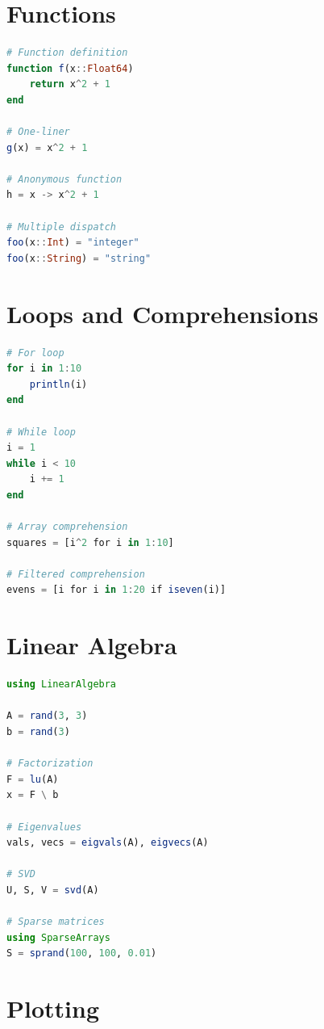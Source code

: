 \section{Functions}
\label{app:julia:functions}

\begin{lstlisting}[language=Julia]
# Function definition
function f(x::Float64)
    return x^2 + 1
end

# One-liner
g(x) = x^2 + 1

# Anonymous function
h = x -> x^2 + 1

# Multiple dispatch
foo(x::Int) = "integer"
foo(x::String) = "string"
    \end{lstlisting}

\section{Loops and Comprehensions}
\label{app:julia:loops}

\begin{lstlisting}[language=Julia]
# For loop
for i in 1:10
    println(i)
end

# While loop
i = 1
while i < 10
    i += 1
end

# Array comprehension
squares = [i^2 for i in 1:10]

# Filtered comprehension
evens = [i for i in 1:20 if iseven(i)]
    \end{lstlisting}

\section{Linear Algebra}
\label{app:julia:linalg}

\begin{lstlisting}[language=Julia]
using LinearAlgebra

A = rand(3, 3)
b = rand(3)

# Factorization
F = lu(A)
x = F \ b

# Eigenvalues
vals, vecs = eigvals(A), eigvecs(A)

# SVD
U, S, V = svd(A)

# Sparse matrices
using SparseArrays
S = sprand(100, 100, 0.01)
    \end{lstlisting}

\section{Plotting}
\label{app:julia:plotting}

